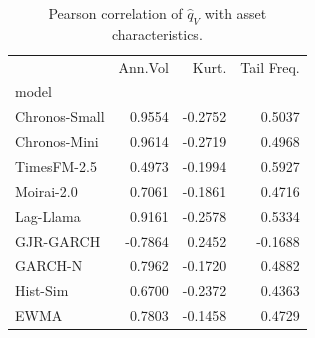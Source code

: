\begin{table}[htbp]
\centering
\caption{Pearson correlation of $\hat{q}_V$ with asset characteristics.}
\label{tab:cross_sectional}
\footnotesize
\begin{tabular}{lrrr}
\toprule
 & Ann.Vol & Kurt. & Tail Freq. \\
model &  &  &  \\
\midrule
Chronos-Small & 0.9554 & -0.2752 & 0.5037 \\
Chronos-Mini & 0.9614 & -0.2719 & 0.4968 \\
TimesFM-2.5 & 0.4973 & -0.1994 & 0.5927 \\
Moirai-2.0 & 0.7061 & -0.1861 & 0.4716 \\
Lag-Llama & 0.9161 & -0.2578 & 0.5334 \\
GJR-GARCH & -0.7864 & 0.2452 & -0.1688 \\
GARCH-N & 0.7962 & -0.1720 & 0.4882 \\
Hist-Sim & 0.6700 & -0.2372 & 0.4363 \\
EWMA & 0.7803 & -0.1458 & 0.4729 \\
\bottomrule
\end{tabular}
\end{table}
